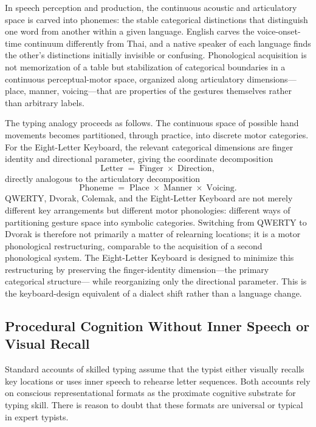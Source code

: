\documentclass[12pt,a4paper]{article}
\theoremstyle{plain}
\theoremstyle{definition}
\theoremstyle{remark}
\begin{document}
In speech perception and production, the continuous acoustic and articulatory
space is carved into phonemes: the stable categorical distinctions that
distinguish one word from another within a given language. English carves the
voice-onset-time continuum differently from Thai, and a native speaker of each
language finds the other's distinctions initially invisible or confusing.
Phonological acquisition is not memorization of a table but stabilization of
categorical boundaries in a continuous perceptual-motor space, organized along
articulatory dimensions---place, manner, voicing---that are properties of
the gestures themselves rather than arbitrary labels.

The typing analogy proceeds as follows. The continuous space of possible hand
movements becomes partitioned, through practice, into discrete motor categories.
For the Eight-Letter Keyboard, the relevant categorical dimensions are finger
identity and directional parameter, giving the coordinate decomposition
\[
  \text{Letter} \;=\; \text{Finger} \;\times\; \text{Direction},
\]
directly analogous to the articulatory decomposition
\[
  \text{Phoneme} \;=\; \text{Place} \;\times\; \text{Manner} \;\times\; \text{Voicing}.
\]
QWERTY, Dvorak, Colemak, and the Eight-Letter Keyboard are not merely different
key arrangements but different motor phonologies: different ways of partitioning
gesture space into symbolic categories. Switching from QWERTY to Dvorak is
therefore not primarily a matter of relearning locations; it is a motor
phonological restructuring, comparable to the acquisition of a second phonological
system. The Eight-Letter Keyboard is designed to minimize this restructuring by
preserving the finger-identity dimension---the primary categorical structure---
while reorganizing only the directional parameter. This is the keyboard-design
equivalent of a dialect shift rather than a language change.

\subsection{Procedural Cognition Without Inner Speech or Visual Recall}

Standard accounts of skilled typing assume that the typist either visually
recalls key locations or uses inner speech to rehearse letter sequences. Both
accounts rely on conscious representational formats as the proximate cognitive
substrate for typing skill. There is reason to doubt that these formats are
universal or typical in expert typists.
\end{document}
